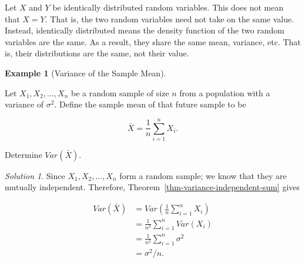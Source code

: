 \documentclass[
  letterpaper,
  DIV=11,
  numbers=noendperiod]{scrreprt}
\theoremstyle{definition}
\theoremstyle{definition}
\newtheorem{example}{Example}[chapter]
\theoremstyle{plain}
\theoremstyle{remark}
\newtheorem*{solution}{Solution}
\begin{document}
\begin{tcolorbox}[enhanced jigsaw, title=\textcolor{quarto-callout-warning-color}{\faExclamationTriangle}\hspace{0.5em}{Warning}, colbacktitle=quarto-callout-warning-color!10!white, titlerule=0mm, toptitle=1mm, breakable, bottomtitle=1mm, colframe=quarto-callout-warning-color-frame, opacitybacktitle=0.6, bottomrule=.15mm, arc=.35mm, toprule=.15mm, colback=white, rightrule=.15mm, coltitle=black, leftrule=.75mm, left=2mm, opacityback=0]

Let \(X\) and \(Y\) be identically distributed random variables. This
does not mean that \(X = Y\). That is, the two random variables need not
take on the same value. Instead, identically distributed means the
density function of the two random variables are the same. As a result,
they share the same mean, variance, etc. That is, their distributions
are the same, not their value.

\end{tcolorbox}

\begin{example}[Variance of the Sample
Mean]\protect\hypertarget{exm-var-xbar}{}\label{exm-var-xbar}

Let \(X_1, X_2, \dotsc, X_n\) be a random sample of size \(n\) from a
population with a variance of \(\sigma^2\). Define the sample mean of
that future sample to be

\[\bar{X} = \frac{1}{n} \sum_{i=1}^{n} X_i.\]

Determine \(Var\left(\bar{X}\right)\).

\end{example}

\begin{solution}

Since \(X_1, X_2, \dotsc, X_n\) form a random sample; we know that they
are mutually independent. Therefore,
Theorem~\ref{thm-variance-independent-sum} gives

\[
\begin{aligned}
  Var\left(\bar{X}\right)
    &= Var\left(\frac{1}{n} \sum_{i=1}^{n} X_i\right) \\
    &= \frac{1}{n^2} \sum_{i=1}^{n} Var\left(X_i\right) \\
    &= \frac{1}{n^2} \sum_{i=1}^{n} \sigma^2 \\
    &= \sigma^2 / n.
\end{aligned}
\]

\end{solution}
\end{document}
